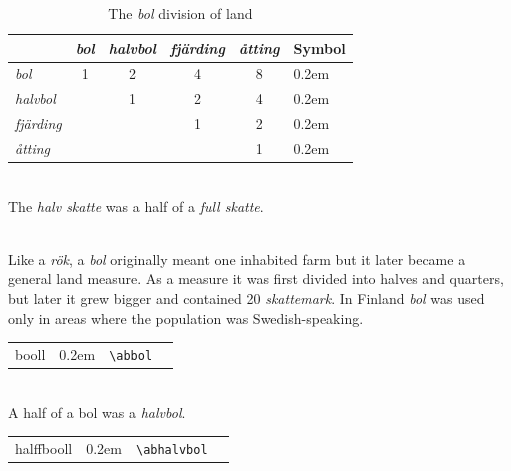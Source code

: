\documentclass[a4paper]{article}
\newcommand{\samplefont}{\fontsize{16}{16}\abcursivefamily\spaceskip0.2em}
\newcommand{\sample}[1]{{\samplefont #1 \strut}}
\newcommand{\ltxncmd}[1]{\texttt{\textbackslash{}#1}}
\begin{document}
\begin{description}
  \begin{table}
    \centering
    \begin{tabular}{lcccc|l}
                  & \emph{bol} & \emph{halvbol} & \emph{fjärding} & \emph{åtting} & Symbol \\
                  \hline
      \emph{bol}  &     1      &      2     &      4          &     8         & \sample{\abbol} \\
      \emph{halvbol}  &        &      1     &      2          &     4         & \sample{\abhalvbol} \\
      \emph{fjärding} &        &            &      1          &     2         & \sample{\abfjarding} \\
      \emph{åtting} &          &            &                 &     1         & \sample{\abotting} \\
    \end{tabular}
    \caption{The \emph{bol} division of land}
    \label{tab:bol}
  \end{table}

\item [\sample{halffskatte}, \emph{halv skatte}, \emph{puolivero}]
  \mbox{} \\
  The \emph{halv skatte} was a half of a \emph{full skatte}. 

\item [\sample{\abbol}, \emph{bol}] \mbox{} \\
  Like a \emph{rök}, a \emph{bol} originally meant one inhabited farm
  but it later became a general land measure. As a measure it was
  first divided into halves and quarters, but later it grew bigger and
  contained 20 \emph{skattemark}. In Finland \emph{bol} was used only
  in areas where the population was Swedish-speaking.

  \begin{center}
    \begin{tabular}{llll}
      {}booll & \sample{\abbol} & \ltxncmd{abbol} \\
    \end{tabular}
  \end{center}


\item [\sample{\abhalvbol}, \emph{halvbol} ]\mbox{} \\
  A half of a bol was a \emph{halvbol}. 
  \begin{center}
    \begin{tabular}{llll}
      {}halffbooll & \sample{\abhalvbol} & \ltxncmd{abhalvbol} \\
    \end{tabular}
  \end{center}


\end{description}
\end{document}

